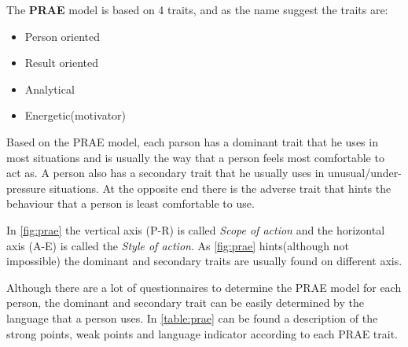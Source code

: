 The \textbf{PRAE} model is based on 4 traits, and as the name suggest the traits are:
\begin{itemize}
\item Person oriented
\item Result oriented
\item Analytical
\item Energetic(motivator)
\end{itemize}

Based on the PRAE model, each parson has a dominant trait that he uses in most situations and is usually the way that a person feels most comfortable to act as. A person also has a secondary trait that he usually uses in unusual/under-pressure situations. At the opposite end there is the adverse trait that hints the behaviour that a person is least comfortable to use.



In \ref{fig:prae} the vertical axis (P-R) is called \textit{Scope of action} and the horizontal axis (A-E) is called the \textit{Style of action}. As \ref{fig:prae} hints(although not impossible) the dominant and secondary traits are usually found on different axis. 

Although there are a lot of questionnaires to determine the PRAE model for each person, the dominant and secondary trait can be easily determined by the language that a person uses. In \ref{table:prae} can be found a description of the strong points, weak points and language indicator according to each PRAE trait.

